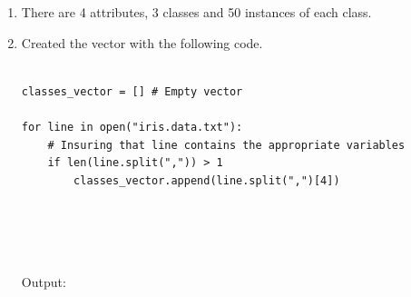\documentclass[12pt]{report}
\begin{document}
\begin{enumerate}  

\item There are 4 attributes, 3 classes and 50 instances of each class.

\item Created the vector with the following code.
\begin{lstlisting}

classes_vector = [] # Empty vector

for line in open("iris.data.txt"):
    # Insuring that line contains the appropriate variables
    if len(line.split(",")) > 1 
    	classes_vector.append(line.split(",")[4])
	


    
\end{lstlisting}

Output:


\end{enumerate}
\end{document}

